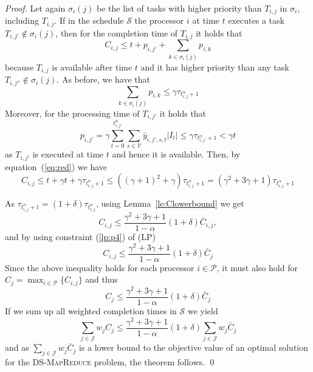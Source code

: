 \documentclass{llncs}
\newcommand{\dmr}{\textsc{DS-MapReduce}\xspace}
\begin{document}
\begin{proof}
Let again $\sigma_i(j)$ be the list of tasks with higher priority than $T_{i,j}$ in $\sigma_i$, including $T_{i,j}$.
If in the schedule $\mathcal{S}$ the processor $i$ at time $t$ executes a task $T_{i,j'} \not\in \sigma_i(j)$,
then for the completion time of $T_{i,j}$ it holds that
\begin{equation}
C_{i,j} \leq t + p_{i,j'} + \sum_{k\in\sigma_i(j)} p_{i,k} \label{eq:red}
\end{equation}
because $T_{i,j}$ is available after time $t$ and it has higher priority than any task $T_{i,j''} \not \in \sigma_i(j)$.
As before, we have that
\begin{equation*}
\sum_{k\in\sigma_i(j)} p_{i,k} \leq \gamma \tau_{t_{i,j}^{\alpha}+1}
\end{equation*}
Moreover, for the processing time of $T_{i,j'}$ it holds that
\begin{equation*}
p_{i,j'} = \gamma \sum_{t=0}^{t_{i,j'}^{\alpha}} \sum_{s \in \mathcal{V}} \bar{y}_{i,j',s,t} |I_t| \leq \gamma \tau_{t_{i,j'}^{\alpha}+1} < \gamma t
\end{equation*}
as $T_{i,j'}$ is executed at time $t$ and hence it is available.
Then, by equation~(\ref{eq:red}) we have
\begin{equation*}
C_{i,j} \leq t + \gamma t + \gamma\tau_{t_{i,j}^{\alpha}+1} \leq ((\gamma+1)^2+\gamma)\tau_{t_{i,j}^{\alpha}+1} = (\gamma^2+3\gamma+1) \tau_{t_{i,j}^{\alpha}+1}
\end{equation*}

As $\tau_{t_{i,j}^{\alpha}+1} = (1+\delta)\tau_{t_{i,j}^{\alpha}}$, using Lemma~\ref{le:Clowerbound} we get
\begin{equation*}
C_{i,j} \leq \frac{\gamma^2+3\gamma+1}{1-\alpha}(1+\delta)\bar{C}_{i,j},\label{eq:cij}
\end{equation*}
and by using constraint (\ref{lp:p4}) of (LP)
\begin{equation*}
C_{i,j} \leq \frac{\gamma^2+3\gamma+1}{1-\alpha}(1+\delta)\bar{C}_{j}
\end{equation*}
Since the above inequality holds for each processor $i \in \mathcal{P}$,
it must also hold for $C_j = \max_{i\in\mathcal{P}}\{C_{i,j}\}$ and thus
\begin{equation*}
C_j \leq \frac{\gamma^2+3\gamma+1}{1-\alpha}(1+\delta)\bar{C}_j
\end{equation*}
If we sum up all weighted completion times in $\mathcal{S}$ we yield
\begin{equation*}
\sum_{j\in \mathcal{J}}w_jC_j \leq \frac{\gamma^2+3\gamma+1}{1-\alpha}(1+\delta)\sum_{j\in \mathcal{J}}w_j\bar{C}_j
\end{equation*}
and as $\sum_{j\in \mathcal{J}}w_j\bar{C}_j$ is a lower bound to the objective value of an optimal solution
for the \dmr problem, the theorem follows. \qed
\end{proof}
\end{document}
